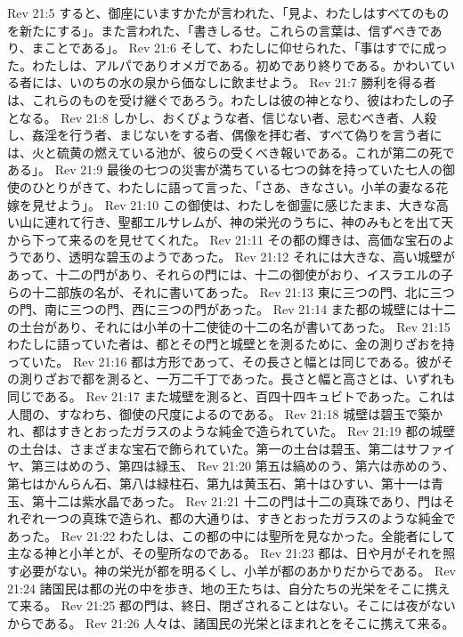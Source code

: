 Rev 21:5  すると、御座にいますかたが言われた、「見よ、わたしはすべてのものを新たにする」。また言われた、「書きしるせ。これらの言葉は、信ずべきであり、まことである」。
Rev 21:6  そして、わたしに仰せられた、「事はすでに成った。わたしは、アルパでありオメガである。初めであり終りである。かわいている者には、いのちの水の泉から価なしに飲ませよう。
Rev 21:7  勝利を得る者は、これらのものを受け継ぐであろう。わたしは彼の神となり、彼はわたしの子となる。
Rev 21:8  しかし、おくびょうな者、信じない者、忌むべき者、人殺し、姦淫を行う者、まじないをする者、偶像を拝む者、すべて偽りを言う者には、火と硫黄の燃えている池が、彼らの受くべき報いである。これが第二の死である」。
Rev 21:9  最後の七つの災害が満ちている七つの鉢を持っていた七人の御使のひとりがきて、わたしに語って言った、「さあ、きなさい。小羊の妻なる花嫁を見せよう」。
Rev 21:10  この御使は、わたしを御霊に感じたまま、大きな高い山に連れて行き、聖都エルサレムが、神の栄光のうちに、神のみもとを出て天から下って来るのを見せてくれた。
Rev 21:11  その都の輝きは、高価な宝石のようであり、透明な碧玉のようであった。
Rev 21:12  それには大きな、高い城壁があって、十二の門があり、それらの門には、十二の御使がおり、イスラエルの子らの十二部族の名が、それに書いてあった。
Rev 21:13  東に三つの門、北に三つの門、南に三つの門、西に三つの門があった。
Rev 21:14  また都の城壁には十二の土台があり、それには小羊の十二使徒の十二の名が書いてあった。
Rev 21:15  わたしに語っていた者は、都とその門と城壁とを測るために、金の測りざおを持っていた。
Rev 21:16  都は方形であって、その長さと幅とは同じである。彼がその測りざおで都を測ると、一万二千丁であった。長さと幅と高さとは、いずれも同じである。
Rev 21:17  また城壁を測ると、百四十四キュビトであった。これは人間の、すなわち、御使の尺度によるのである。
Rev 21:18  城壁は碧玉で築かれ、都はすきとおったガラスのような純金で造られていた。
Rev 21:19  都の城壁の土台は、さまざまな宝石で飾られていた。第一の土台は碧玉、第二はサファイヤ、第三はめのう、第四は緑玉、
Rev 21:20  第五は縞めのう、第六は赤めのう、第七はかんらん石、第八は緑柱石、第九は黄玉石、第十はひすい、第十一は青玉、第十二は紫水晶であった。
Rev 21:21  十二の門は十二の真珠であり、門はそれぞれ一つの真珠で造られ、都の大通りは、すきとおったガラスのような純金であった。
Rev 21:22  わたしは、この都の中には聖所を見なかった。全能者にして主なる神と小羊とが、その聖所なのである。
Rev 21:23  都は、日や月がそれを照す必要がない。神の栄光が都を明るくし、小羊が都のあかりだからである。
Rev 21:24  諸国民は都の光の中を歩き、地の王たちは、自分たちの光栄をそこに携えて来る。
Rev 21:25  都の門は、終日、閉ざされることはない。そこには夜がないからである。
Rev 21:26  人々は、諸国民の光栄とほまれとをそこに携えて来る。
